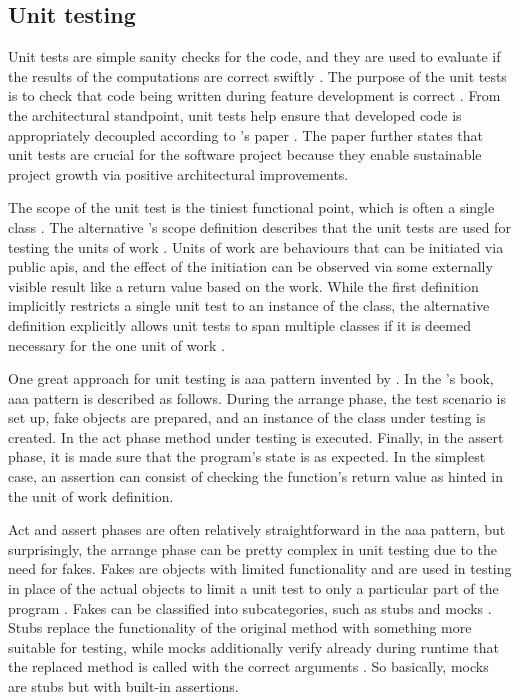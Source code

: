 \subsection{Unit testing}\label{subsection:unit_testing}
Unit tests are simple sanity checks for the code, and they are used to evaluate if the results of the computations are correct swiftly \cite{acharya2014mastering}. The purpose of the unit tests is to check that code being written during feature development is correct \cite{simon2014mastering}. From the architectural standpoint, unit tests help ensure that developed code is appropriately decoupled according to \citeauthor{khorikov2020unit}'s paper \cite{khorikov2020unit}. The paper further states that unit tests are crucial for the software project because they enable sustainable project growth via positive architectural improvements.

The scope of the unit test is the tiniest functional point, which is often a single class \cite{huizinga2007automated}. The alternative \citeauthor{osherove2013art}'s scope definition describes that the unit tests are used for testing the units of work \cite{osherove2013art}. Units of work are behaviours that can be initiated via public \glspl{api}, and the effect of the initiation can be observed via some externally visible result like a return value based on the work. While the first definition implicitly restricts a single unit test to an instance of the class, the alternative definition explicitly allows unit tests to span multiple classes if it is deemed necessary for the one unit of work \cite{huizinga2007automated, osherove2013art}.

One great approach for unit testing is \gls{aaa} pattern invented by \citeauthor{wake2011aaa} \cite{wake2011aaa}. In the \citeauthor{simon2014mastering}'s book, \gls{aaa} pattern is described as follows. During the arrange phase, the test scenario is set up, fake objects are prepared, and an instance of the class under testing is created. In the act phase method under testing is executed. Finally, in the assert phase, it is made sure that the program's state is as expected. In the simplest case, an assertion can consist of checking the function's return value as hinted in the unit of work \cite{osherove2013art} definition.

Act and assert phases are often relatively straightforward in the \gls{aaa} pattern, but surprisingly, the arrange phase can be pretty complex in unit testing due to the need for fakes. Fakes are objects with limited functionality and are used in testing in place of the actual objects to limit a unit test to only a particular part of the program \cite{simon2014mastering}. Fakes can be classified into subcategories, such as stubs and mocks \cite{simon2014mastering}. Stubs replace the functionality of the original method with something more suitable for testing, while mocks additionally verify already during runtime that the replaced method is called with the correct arguments \cite{ammann2016introduction}. So basically, mocks are stubs but with built-in assertions.

